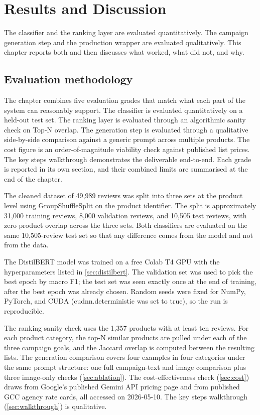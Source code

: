 \documentclass[12pt,a4paper]{report}
\begin{document}
\chapter{Results and Discussion}
\label{ch:results}

The classifier and the ranking layer are evaluated quantitatively. The campaign generation step and the production wrapper are evaluated qualitatively. This chapter reports both and then discusses what worked, what did not, and why.

\section{Evaluation methodology}
\label{sec:setup}

The chapter combines five evaluation grades that match what each part of the system can reasonably support. The classifier is evaluated quantitatively on a held-out test set. The ranking layer is evaluated through an algorithmic sanity check on Top-N overlap. The generation step is evaluated through a qualitative side-by-side comparison against a generic prompt across multiple products. The cost figure is an order-of-magnitude viability check against published list prices. The key steps walkthrough demonstrates the deliverable end-to-end. Each grade is reported in its own section, and their combined limits are summarised at the end of the chapter.

The cleaned dataset of 49,989 reviews was split into three sets at the product level using GroupShuffleSplit on the product identifier. The split is approximately 31,000 training reviews, 8,000 validation reviews, and 10,505 test reviews, with zero product overlap across the three sets. Both classifiers are evaluated on the same 10,505-review test set so that any difference comes from the model and not from the data.

The DistilBERT model was trained on a free Colab T4 GPU with the hyperparameters listed in \cref{sec:distilbert}. The validation set was used to pick the best epoch by macro F1; the test set was seen exactly once at the end of training, after the best epoch was already chosen. Random seeds were fixed for NumPy, PyTorch, and CUDA (cudnn.deterministic was set to true), so the run is reproducible.

The ranking sanity check uses the 1,357 products with at least ten reviews. For each product category, the top-N similar products are pulled under each of the three campaign goals, and the Jaccard overlap is computed between the resulting lists. The generation comparison covers four examples in four categories under the same prompt structure: one full campaign-text and image comparison plus three image-only checks (\cref{sec:ablation}). The cost-effectiveness check (\cref{sec:cost}) draws from Google's published Gemini API pricing page and from published GCC agency rate cards, all accessed on 2026-05-10. The key steps walkthrough (\cref{sec:walkthrough}) is qualitative.
\end{document}
